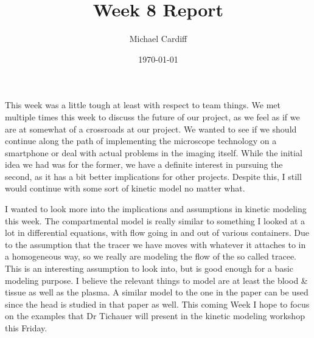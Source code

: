 \documentclass[12pt]{article}
\title{\vspace{-3em}Week 8 Report}
\author{Michael Cardiff}
\date{\today}
\begin{document}
\maketitle
This week was a little tough at least with respect to team things. We met multiple times this week to discuss the future of our project, as we feel as if we are at somewhat of a crossroads at our project. We wanted to see if we should continue along the path of implementing the microscope technology on a smartphone or deal with actual problems in the imaging itself. While the initial idea we had was for the former, we have a definite interest in pursuing the second, as it has a bit better implications for other projects. Despite this, I still would continue with some sort of kinetic model no matter what.

I wanted to look more into the implications and assumptions in kinetic modeling this week. The compartmental model is really similar to something I looked at a lot in differential equations, with flow going in and out of various containers. Due to the assumption that the tracer we have moves with whatever it attaches to in a homogeneous way, so we really are modeling the flow of the so called tracee. This is an interesting assumption to look into, but is good enough for a basic modeling purpose. I believe the relevant things to model are at least the blood \& tissue as well as the plasma. A similar model to the one in the paper can be used since the head is studied in that paper as well. This coming Week I hope to focus on the examples that Dr Tichauer will present in the kinetic modeling workshop this Friday. 
\end{document}
